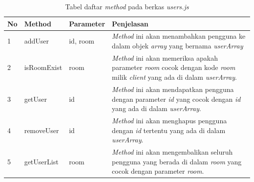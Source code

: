 \begin{enumerate}
\begin{enumerate}
\begin{itemize}
			\begin{table}[H]
				\centering
				\caption{Tabel daftar \textit{method} pada berkas \textit{users.js}}
				\begin{tabular}{|p{0.35cm}|p{3cm}|p{3cm}|p{7cm}|}
					\hline
					No & Method & Parameter & Penjelasan \\ \hline
					1 & addUser & id, room & \textit{Method} ini akan menambahkan pengguna ke dalam objek \textit{array} yang bernama \textit{userArray} \\ \hline
					2 & isRoomExist & room & \textit{Method} ini akan memeriksa apakah parameter \textit{room} cocok dengan kode \textit{room} milik \textit{client} yang ada di dalam \textit{userArray}. \\ \hline
					3 & getUser & id & \textit{Method} ini akan mendapatkan pengguna dengan parameter \textit{id} yang cocok dengan \textit{id} yang ada di dalam \textit{userArray}. \\ \hline
					4 & removeUser & id & \textit{Method} ini akan menghapus pengguna dengan \textit{id} tertentu yang ada di dalam \textit{userArray}. \\ \hline
					5 & getUserList & room & \textit{Method} ini akan mengembalikan seluruh pengguna yang berada di dalam \textit{room} yang cocok dengan parameter \textit{room}. \\ \hline
				\end{tabular}
				\label{table:method_users}
			\end{table}
%				

\end{itemize}
\end{enumerate}
\end{enumerate}

